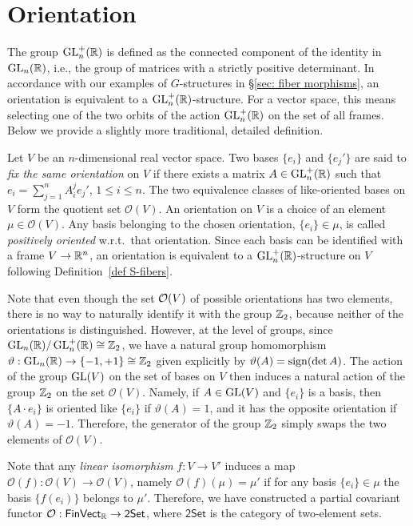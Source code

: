\section{Orientation}

The group $\operatorname{GL}^+_n(\mathbb{R} )$ is defined as the connected component of the identity in $\operatorname{GL}_n(\mathbb{R} )$, i.e., the group of matrices with a strictly positive determinant. In accordance with our examples of $G$-structures in \S\ref{sec: fiber morphisms}, an orientation is equivalent to a $\operatorname{GL}_n^+(\mathbb{R})$-structure. For a vector space, this means selecting one of the two orbits of the action $\operatorname{GL}_n^+(\mathbb{R})$ on the set of all frames. Below we provide a slightly more traditional, detailed definition.

\begin{defn}
    Let $V$ be an $n$-dimensional real vector space. Two bases $\{e_i\}$ and $\{e_j'\}$ are said to \emph{fix the same orientation} on $V$ if there exists a matrix $A\in\operatorname{GL}^+_n(\mathbb{R} )$ such that $e_i=\sum_{j=1}^n A_i^j e_j'$, $1\leq i\leq n$. The two equivalence classes of like-oriented bases on $V$ form the quotient set $\mathcal{O}(V)$. An orientation on $V$ is a choice of an element $\mu\in\mathcal{O}(V)$. Any basis belonging to the chosen orientation, $\{e_i\}\in\mu$, is called \emph{positively oriented} w.r.t.\ that orientation. Since each basis can be identified with a frame $V\to \mathbb{R}^n$, an orientation is equivalent to a $\operatorname{GL}_n^+(\mathbb{R})$-structure on $V$ following Definition~\ref{def S-fibers}.
\end{defn}

Note that even though the set $\mathcal{O}(V)$ of possible orientations has two elements, there is no way to naturally identify it with the group $\mathbb{Z}_2$, because neither of the orientations is distinguished. However, at the level of groups, since $\operatorname{GL}_n(\mathbb{R} )\slash\operatorname{GL}^+_n(\mathbb{R} )\cong\mathbb{Z}_2$, we have a natural group homomorphism $\vartheta:\operatorname{GL}_n(\mathbb{R} )\to \{-1,+1\}\cong \mathbb{Z}_2$ given explicitly by $\vartheta(A)=\operatorname{sign} (\det A)$. The action of the group $\operatorname{GL}(V)$ on the set of bases on $V$ then induces a natural action of the group $\mathbb{Z}_2$ on the set $\mathcal{O}(V)$. Namely, if $A\in\operatorname{GL}(V)$ and $\{e_i\}$ is a basis, then $\{A\cdot e_i\}$ is oriented like $\{e_i\}$ if $\vartheta(A)=1$, and it has the opposite orientation if $\vartheta(A)=-1$. Therefore, the generator of the group $\mathbb{Z}_2$ simply swaps the two elements of $\mathcal{O}(V)$.

Note that any \emph{linear isomorphism} $f:V\to V'$ induces a map $\mathcal{O}(f):\mathcal{O}(V)\to\mathcal{O}(V)$, namely $\mathcal{O}(f)(\mu)=\mu'$ if for any basis $\{e_i\}\in\mu$ the basis $\{f(e_i)\}$ belongs to $\mu'$. Therefore, we have constructed a partial covariant functor $\mathcal{O}:\mathsf{FinVect}_{\mathbb{R}} \to\mathsf{2Set}$, where $\mathsf{2Set}$ is the category of two-element sets.

